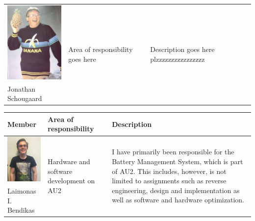 \begin{tabular}[c]{|p{3cm}| p{5cm} | p{6cm}|}
	\phantom{Test}
	\includegraphics[width=3cm]{Introduction/TeamPictures/Jonathan} & \multirow{2}{5cm}{Area of responsibility goes here} & \multirow{2}{6cm}{Description goes here plzzzzzzzzzzzzzzzz} \\
	Jonathan Schougaard & & \\ \hline
\end{tabular}

\newpage
\begin{tabular}[c]{|p{3cm}| p{5cm} | p{6cm}|}
	\hline
	\textbf{Member} & \textbf{Area of responsibility} & \textbf{Description}\\\hline
	
	\phantom{Test}
	\includegraphics[width=3cm]{Introduction/TeamPictures/Laimonas} & \multirow{2}{5cm}{Hardware and software development on AU2} & \multirow{2}{6cm}{I have primarily been responsible for the Battery Management System, which is part of AU2. This includes, however, is not limited to assignments such as reverse engineering, design and implementation as well as software and hardware optimization.} \\
	Laimonas I. \newline Bendikas & & \\ \hline
		

\end{tabular}
